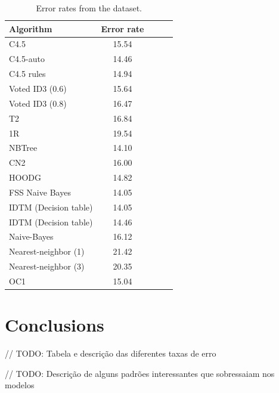 \documentclass[a4paper]{llncs}
\begin{document}
\begin{table}[ht]
  \begin{center}
  \begin{tabular}{ | l | c | c | c | c |}
    \hline
    \textbf{Algorithm} & \textbf{Error rate} \\ \hline
    C4.5 & 15.54 \\ \hline
    C4.5-auto & 14.46 \\ \hline
    C4.5 rules & 14.94 \\ \hline
    Voted ID3 (0.6) & 15.64 \\ \hline
    Voted ID3 (0.8) & 16.47 \\ \hline
    T2 & 16.84 \\ \hline
    1R & 19.54 \\ \hline
    NBTree & 14.10 \\ \hline
    CN2 & 16.00 \\ \hline
    HOODG & 14.82 \\ \hline
    FSS Naive Bayes & 14.05 \\ \hline
    IDTM (Decision table) & 14.05 \\ \hline
    IDTM (Decision table) & 14.46 \\ \hline
    Naive-Bayes & 16.12 \\ \hline
    Nearest-neighbor (1) & 21.42 \\ \hline
    Nearest-neighbor (3) & 20.35 \\ \hline
    OC1 & 15.04 \\ \hline
  \end{tabular}
  \caption{Error rates from the dataset.}
  \label{tbl:dataset_error_rates}
  \end{center}
\end{table}

\section{Conclusions}

// TODO: Tabela e descrição das diferentes taxas de erro

// TODO: Descrição de alguns padrões interessantes que sobressaiam nos modelos
\end{document}

